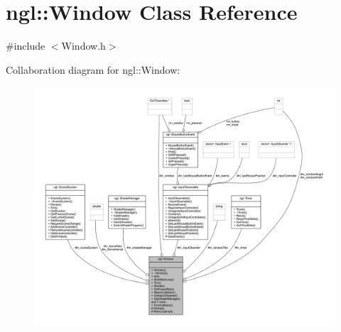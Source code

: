 \hypertarget{classngl_1_1_window}{}\section{ngl\+:\+:Window Class Reference}
\label{classngl_1_1_window}


{\ttfamily \#include $<$Window.\+h$>$}



Collaboration diagram for ngl\+:\+:Window\+:
\nopagebreak
\begin{figure}[H]
\begin{center}
\leavevmode
\includegraphics[width=350pt]{classngl_1_1_window__coll__graph}
\end{center}
\end{figure}
